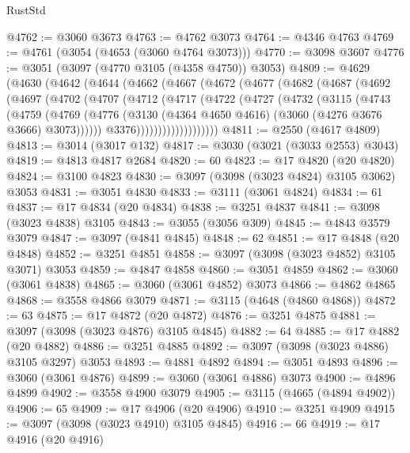 \begin{lexlean}{RustStd}
\begin{coremodule}
{\begin{coremodule}
{{{{{{{{{{{{{{{{{{{{{{{{{{{{{{{{@4762 := @3060 @3673
@4763 := @4762 @3073
@4764 := @4346 @4763
@4769 := @4761 (@3054 (@4653 (@3060 @4764 @3073)))
@4770 := @3098 @3607
@4776 := @3051 (@3097 (@4770 @3105 (@4358 @4750)) @3053)
@4809 := @4629
    (@4630
      (@4642
        (@4644
          (@4662
            (@4667
              (@4672
                (@4677
                  (@4682
                    (@4687
                      (@4692
                        (@4697
                          (@4702
                            (@4707
                              (@4712
                                (@4717
                                  (@4722
                                    (@4727
                                      (@4732
                                        (@3115
                                          (@4743
                                            (@4759
                                              (@4769
                                                (@4776
                                                  (@3130
                                                    (@4364 @4650 @4616)
                                                    (@3060 (@4276 @3676 @3666) @3073))))))
                                          @3376)))))))))))))))))))
@4811 := @2550 (@4617 @4809)
@4813 := @3014 (@3017 @132)
@4817 := @3030 (@3021 (@3033 @2553) @3043)
@4819 := @4813 @4817 @2684
@4820 := 60
@4823 := @17 @4820 (@20 @4820)
@4824 := @3100 @4823
@4830 := @3097 (@3098 (@3023 @4824) @3105 @3062) @3053
@4831 := @3051 @4830
@4833 := @3111 (@3061 @4824)
@4834 := 61
@4837 := @17 @4834 (@20 @4834)
@4838 := @3251 @4837
@4841 := @3098 (@3023 @4838) @3105
@4843 := @3055 (@3056 @309)
@4845 := @4843 @3579 @3079
@4847 := @3097 (@4841 @4845)
@4848 := 62
@4851 := @17 @4848 (@20 @4848)
@4852 := @3251 @4851
@4858 := @3097 (@3098 (@3023 @4852) @3105 @3071) @3053
@4859 := @4847 @4858
@4860 := @3051 @4859
@4862 := @3060 (@3061 @4838)
@4865 := @3060 (@3061 @4852) @3073
@4866 := @4862 @4865
@4868 := @3558 @4866 @3079
@4871 := @3115 (@4648 (@4860 @4868))
@4872 := 63
@4875 := @17 @4872 (@20 @4872)
@4876 := @3251 @4875
@4881 := @3097 (@3098 (@3023 @4876) @3105 @4845)
@4882 := 64
@4885 := @17 @4882 (@20 @4882)
@4886 := @3251 @4885
@4892 := @3097 (@3098 (@3023 @4886) @3105 @3297) @3053
@4893 := @4881 @4892
@4894 := @3051 @4893
@4896 := @3060 (@3061 @4876)
@4899 := @3060 (@3061 @4886) @3073
@4900 := @4896 @4899
@4902 := @3558 @4900 @3079
@4905 := @3115 (@4665 (@4894 @4902))
@4906 := 65
@4909 := @17 @4906 (@20 @4906)
@4910 := @3251 @4909
@4915 := @3097 (@3098 (@3023 @4910) @3105 @4845)
@4916 := 66
@4919 := @17 @4916 (@20 @4916)
}}}}}}}}}}}}}}}}}}}}}}}}}}}}}}}}
\end{coremodule}}
\end{coremodule}
\end{lexlean}
